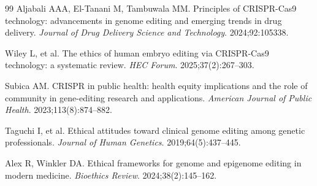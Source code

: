 \documentclass[11pt,a4paper]{article}
\begin{document}
\begin{thebibliography}{99}
Aljabali AAA, El-Tanani M, Tambuwala MM.
Principles of CRISPR-Cas9 technology: advancements in genome editing and emerging trends in drug delivery.
\textit{Journal of Drug Delivery Science and Technology}. 2024;92:105338.

Wiley L, et al.
The ethics of human embryo editing via CRISPR-Cas9 technology: a systematic review.
\textit{HEC Forum}. 2025;37(2):267--303.

Subica AM.
CRISPR in public health: health equity implications and the role of community in gene-editing research and applications.
\textit{American Journal of Public Health}. 2023;113(8):874--882.

Taguchi I, et al.
Ethical attitudes toward clinical genome editing among genetic professionals.
\textit{Journal of Human Genetics}. 2019;64(5):437--445.

Alex R, Winkler DA.
Ethical frameworks for genome and epigenome editing in modern medicine.
\textit{Bioethics Review}. 2024;38(2):145--162.

\end{thebibliography}
\endgroup
\end{document}
